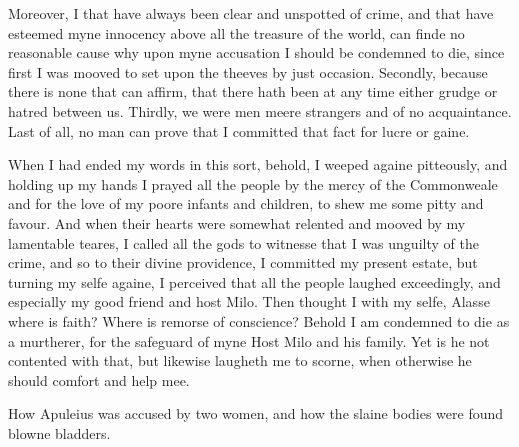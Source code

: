 Moreover, I that have always been clear and unspotted of crime, and that have
esteemed myne innocency above all the treasure of the world, can finde no
reasonable cause why upon myne accusation I should be condemned to die, since
first I was mooved to set upon the theeves by just occasion. Secondly, because
there is none that can affirm, that there hath been at any time either grudge
or hatred between us. Thirdly, we were men meere strangers and of no
acquaintance. Last of all, no man can prove that I committed that fact for
lucre or gaine.

When I had ended my words in this sort, behold, I weeped againe pitteously, and
holding up my hands I prayed all the people by the mercy of the Commonweale and
for the love of my poore infants and children, to shew me some pitty and
favour. And when their hearts were somewhat relented and mooved by my
lamentable teares, I called all the gods to witnesse that I was unguilty of the
crime, and so to their divine providence, I committed my present estate, but
turning my selfe againe, I perceived that all the people laughed exceedingly,
and especially my good friend and host Milo. Then thought I with my selfe,
Alasse where is faith? Where is remorse of conscience? Behold I am condemned to
die as a murtherer, for the safeguard of myne Host Milo and his family. Yet is
he not contented with that, but likewise laugheth me to scorne, when otherwise
he should comfort and help mee.


How Apuleius was accused by two women, and how the slaine bodies were found
blowne bladders.

